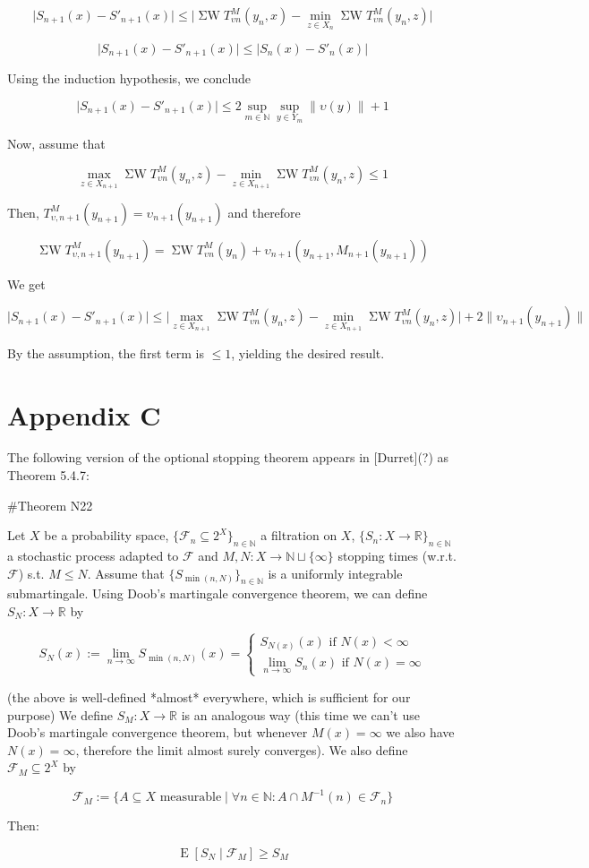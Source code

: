 \documentclass[a4paper]{article}
\DeclareMathOperator{\E}{E}
\newcommand{\Nats}{\mathbb{N}}
\newcommand{\Reals}{\mathbb{R}}
\newcommand{\Sq}[2]{\{#1\}_{#2 \in \Nats}}
\newcommand{\Sqn}[1]{\Sq{#1}{n}}
\newcommand{\Abs}[1]{\lvert #1 \rvert}
\newcommand{\Norm}[1]{\lVert #1 \rVert}
\newcommand{\SW}{\operatorname{\Sigma W}}
\newcommand{\F}{\mathcal{F}}
\begin{document}
$$\Abs{S_{n+1}(x)-S'_{n+1}(x)} \leq \Abs{\SW T^M_{\upsilon n}(y_n,x) - \min_{z \in X_{n}}\SW T^M_{\upsilon n}(y_n,z)}$$

$$\Abs{S_{n+1}(x)-S'_{n+1}(x)} \leq \Abs{S_n(x)-S'_n(x)}$$

Using the induction hypothesis, we conclude

$$\Abs{S_{n+1}(x)-S'_{n+1}(x)} \leq 2 \sup_{m \in \Nats} \sup_{y \in Y_m} \Norm{\upsilon(y)} + 1$$

Now, assume that 

$$\max_{z \in X_{n+1}} \SW T^M_{\upsilon n}(y_n,z)-\min_{z \in X_{n+1}} \SW T^M_{\upsilon n}(y_n,z) \leq 1$$

Then, ${T^M_{\upsilon,n+1}}(y_{n+1}) = \upsilon_{n+1}(y_{n+1})$ and therefore

$$\SW T^M_{\upsilon,n+1}(y_{n+1})=\SW T^M_{\upsilon n}(y_{n}) + \upsilon_{n+1}(y_{n+1},M_{n+1}(y_{n+1}))$$

We get

$$\Abs{S_{n+1}(x)-S'_{n+1}(x)} \leq \Abs{\max_{z \in X_{n+1}} \SW T^M_{\upsilon n}(y_n,z) - \min_{z \in X_{n+1}}\SW T^M_{\upsilon n}(y_n,z)} + 2 \Norm{\upsilon_{n+1}(y_{n+1})}$$

By the assumption, the first term is ${\leq 1}$, yielding the desired result.

\section{Appendix C}

The following version of the optional stopping theorem appears in [Durret](?) as Theorem 5.4.7:

\#Theorem N22

Let ${X}$ be a probability space, ${\Sqn{\F_n \subseteq 2^X}}$ a filtration on ${X}$, ${\Sqn{S_n: X \rightarrow \Reals}}$ a stochastic process adapted to ${\F}$ and ${M,N: X \rightarrow \Nats \sqcup \{\infty\}}$ stopping times (w.r.t. ${\F}$) s.t. ${M \leq N}$. Assume that ${\Sqn{S_{\min(n,N)}}}$ is a uniformly integrable submartingale. Using Doob's martingale convergence theorem, we can define ${S_N : X \rightarrow \Reals}$ by

$$S_N(x):=\lim_{n \rightarrow \infty} S_{\min(n,N)}(x)=\begin{cases}S_{N(x)}(x) \text{ if } N(x) < \infty\\\lim_{n \rightarrow \infty} S_n(x) \text{ if } N(x) = \infty\end{cases}$$

(the above is well-defined *almost* everywhere, which is sufficient for our purpose) We define ${S_M: X \rightarrow \Reals}$ is an analogous way (this time we can't use Doob's martingale convergence theorem, but whenever ${M(x) = \infty}$ we also have ${N(x) = \infty}$, therefore the limit almost surely converges). We also define ${\F_M \subseteq 2^X}$ by

$$\F_M:=\{A \subseteq X \text{ measurable} \mid \forall n \in \Nats: A \cap M^{-1}(n) \in \F_n\}$$

Then:

$$\E[S_N \mid \F_M] \geq S_M$$
\end{document}
